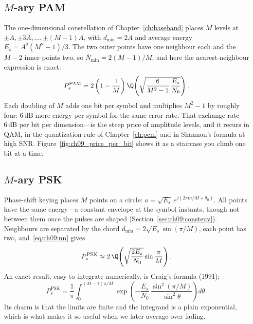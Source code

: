 \subsection{\texorpdfstring{$M$}{M}-ary PAM}

The one-dimensional constellation of Chapter~\ref{ch:baseband} places $M$ levels at
$\pm A,\pm3A,\dots,\pm(M-1)A$, with $d_{\min}=2A$ and average energy
$E_s=A^2(M^2-1)/3$. The two outer points have one neighbour each and the $M-2$ inner points two,
so $\bar N_{\min}=2(M-1)/M$, and here the nearest-neighbour expression is exact:
\begin{equation}
P_s^{\text{PAM}}=2\left(1-\frac1M\right)\Q\!\left(\sqrt{\frac{6}{M^2-1}\,\frac{E_s}{N_0}}\right).
\label{eq:ch09:pam}
\end{equation}
Each doubling of $M$ adds one bit per symbol and multiplies $M^2-1$ by roughly four: 6\,dB more
energy per symbol for the same error rate. That exchange rate---6\,dB per bit per dimension---is
the steep price of amplitude levels, and it recurs in QAM, in the quantization rule of
Chapter~\ref{ch:pcm} and in Shannon's formula at high SNR. Figure~\ref{fig:ch09_price_per_bit}
shows it as a staircase you climb one bit at a time.


\subsection{\texorpdfstring{$M$}{M}-ary PSK}

Phase-shift keying places $M$ points on a circle: $a=\sqrt{E_s}\,e^{j(2\pi m/M+\theta_0)}$. All
points have the same energy---a constant envelope at the symbol instants, though not between them
once the pulses are shaped (Section~\ref{sec:ch09:constenv}). Neighbours are separated by the
chord $d_{\min}=2\sqrt{E_s}\sin(\pi/M)$, each point has two, and~\eqref{eq:ch09:nn} gives
\begin{equation}
P_s^{\text{PSK}}\approx2\,\Q\!\left(\sqrt{\frac{2E_s}{N_0}}\sin\frac\pi M\right) .
\label{eq:ch09:psk}
\end{equation}
An exact result, easy to integrate numerically, is Craig's formula (1991):
\begin{equation}
P_s^{\text{PSK}}=\frac1\pi\int_0^{(M-1)\pi/M}\exp\!\left(-\frac{E_s}{N_0}\,\frac{\sin^2(\pi/M)}{\sin^2\theta}\right)d\theta .
\label{eq:ch09:craig}
\end{equation}
Its charm is that the limits are finite and the integrand is a plain exponential, which is what
makes it so useful when we later average over fading.

